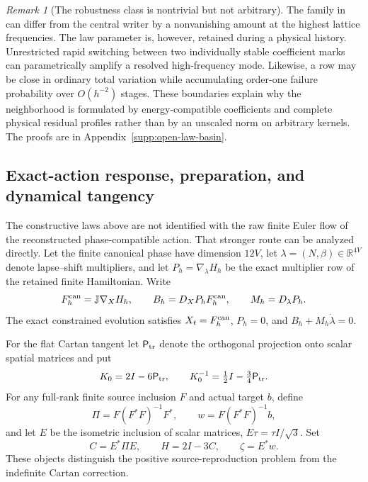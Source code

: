 \documentclass[11pt]{article}
\theoremstyle{definition}
\theoremstyle{remark}
\newtheorem{remark}[remark]{Remark}
\begin{document}
\begin{remark}[The robustness class is nontrivial but not arbitrary]
\label{rem:main-law-basin-scope}
The family in  can differ from the central
writer by a nonvanishing amount at the highest lattice frequencies.  The law
parameter is, however, retained during a physical history.  Unrestricted
rapid switching between two individually stable coefficient marks can
parametrically amplify a resolved high-frequency mode.  Likewise, a row may
be close in ordinary total variation while accumulating order-one failure
probability over $O(h^{-2})$ stages.  These boundaries explain why the
neighborhood is formulated by energy-compatible coefficients and complete
physical residual profiles rather than by an unscaled norm on arbitrary
kernels.  The proofs are in Appendix~\ref{supp:open-law-basin}.
\end{remark}

\subsection{Exact-action response, preparation, and dynamical tangency}
\label{subsec:main-exact-action-audit}

The constructive laws above are not identified with the raw finite Euler flow
of the reconstructed phase-compatible action.  That stronger route can be
analyzed directly.  Let the finite canonical phase have dimension $12V$,
let $\lambda=(N,\beta)\in\mathbb R^{4V}$ denote lapse--shift multipliers,
and let $P_h=\nabla_\lambda H_h$ be the exact multiplier row of the retained
finite Hamiltonian.  Write
\begin{equation}
 F_h^{\rm can}=\mathbb J\nabla_XH_h,\qquad
 B_h=D_XP_hF_h^{\rm can},\qquad M_h=D_\lambda P_h.
 \label{eq:main-exact-action-basic}
\end{equation}
The exact constrained evolution satisfies
$X_t=F_h^{\rm can}$, $P_h=0$, and
$B_h+M_h\dot\lambda=0$.

For the flat Cartan tangent let $\mathsf P_{\rm tr}$ denote the orthogonal
projection onto scalar spatial matrices and put
\begin{equation}
 K_0=2I-6\mathsf P_{\rm tr},\qquad
 K_0^{-1}=\tfrac12I-\tfrac34\mathsf P_{\rm tr}.
 \label{eq:main-exact-action-K0}
\end{equation}
For any full-rank finite source inclusion $F$ and actual target $b$, define
\begin{equation}
 \Pi=F(F^*F)^{-1}F^*,\qquad
 w=F(F^*F)^{-1}b,
 \label{eq:main-exact-action-positive-reproduction}
\end{equation}
and let $E$ be the isometric inclusion of scalar matrices,
$E\tau=\tau I/\sqrt3$.  Set
\begin{equation}
 C=E^*\Pi E,\qquad H=2I-3C,\qquad \zeta=E^*w.
 \label{eq:main-exact-action-trace-data}
\end{equation}
These objects distinguish the positive source-reproduction problem from the
indefinite Cartan correction.
\end{document}
